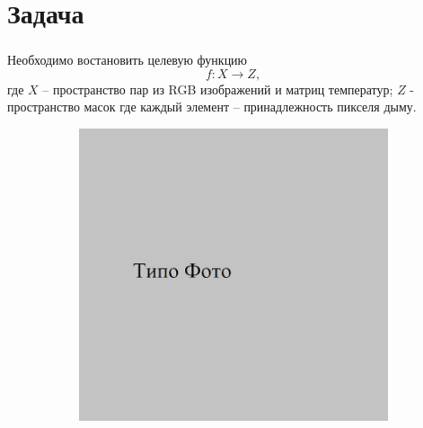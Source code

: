 \documentclass[t]{beamer}
\begin{document}
\section{Задача}

	\begin{frame}
		\frametitle{\insertsection} 
		\vspace*{-0.3cm}
		Необходимо востановить целевую функцию
		\begin{equation}
			f: X \rightarrow Z,
			\label{eq:segment_func}
		\end{equation}
	где $X$ -- пространство пар из RGB изображений и матриц температур;
	$Z$ - пространство масок где каждый элемент -- принадлежность пикселя дыму.
	\begin{figure}[ht!]
		\begin{subfigure}{.25\textwidth}
			\centering
			\includegraphics[width = \textwidth]{image/opt_examp}
			\caption{}
		\end{subfigure}
		\begin{subfigure}{.25\textwidth}
			\centering

\end{subfigure}
\end{figure}
\end{frame}
\end{document}
